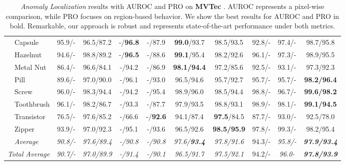\documentclass[10pt,twocolumn,letterpaper]{article}
\begin{document}
\begin{table*}[!ht]
\begin{tabular}{ccccccccccc}
\multicolumn{1}{c|}{} & \multicolumn{1}{l|}{Capsule} & 95.9/- & \multicolumn{1}{c|}{96.5/87.2} & -/\textbf{96.8} & -/87.9 & \textbf{99.0}/93.7 & 98.5/93.5 & 92.8/- & 97.4/- & 98.7/95.8 \\
\multicolumn{1}{c|}{} & \multicolumn{1}{l|}{Hazelnut} & 94.6/- & \multicolumn{1}{c|}{98.8/89.2} & -/\textbf{96.5} & -/88.6 & \textbf{99.1}/95.4 & 98.2/92.6 & 96.1/- & 97.3/- & 98.9/95.5 \\ 
\multicolumn{1}{c|}{} & \multicolumn{1}{l|}{Metal Nut} & 86.4/- & \multicolumn{1}{c|}{96.6/84.1} & -/94.2 & -/86.9 & \textbf{98.1/94.4} & 97.2/85.6 & 92.5/- & 93.1/- & 97.3/92.3 \\ 
\multicolumn{1}{c|}{} & \multicolumn{1}{l|}{Pill} & 89.6/- & \multicolumn{1}{c|}{97.0/90.0} & -/96.1 & -/93.0 & 96.5/94.6 & 95.7/92.7 & 95.7/- & 95.7/- & \textbf{98.2/96.4} \\ 
\multicolumn{1}{c|}{} & \multicolumn{1}{l|}{Screw} & 96.0/- & \multicolumn{1}{c|}{98.3/94.4} & -/94.2 & -/95.4 & 98.9/96.0 & 98.5/94.4 & 98.8/- & 96.7/- & \textbf{99.6/98.2} \\ 
\multicolumn{1}{c|}{} & \multicolumn{1}{l|}{Toothbrush} & 96.1/- & \multicolumn{1}{c|}{98.2/86.7} & -/93.3 & -/87.7 & 97.9/93.5 & 98.8/93.1 & 98.9/- & 98.1/- & \textbf{99.1/94.5} \\ 
\multicolumn{1}{c|}{} & \multicolumn{1}{l|}{Transistor} & 76.5/- & \multicolumn{1}{c|}{97.6/85.2} & -/66.6 & -/\textbf{92.6} & 94.1/87.4 & \textbf{97.5}/84.5 & 87.7/- & 93.0/- & 92.5/78.0 \\ 
\multicolumn{1}{c|}{} & \multicolumn{1}{l|}{Zipper} & 93.9/- & \multicolumn{1}{c|}{97.0/92.3} & -/95.1 & -/93.6 & 96.5/92.6 & \textbf{98.5/95.9} & 97.8/- & 99.3/- & 98.2/95.4 \\ \cline{2-11} 
\multicolumn{1}{c|}{} & \multicolumn{1}{l|}{\textit{Average}} & \textit{90.8/-} & \multicolumn{1}{c|}{\textit{97.6/89.4}} & \textit{-/90.8} & \textit{-/90.8} & \textit{97.6/\textbf{93.4}} & \textit{97.8/91.6} & 94.3/- & \textit{95.8/-} & \textit{\textbf{97.9/93.4}} \\ \hline
\multicolumn{2}{c}{\textit{Total Average}} & \textit{90.7/-} & \textit{97.0/89.9} & \textit{-/91.4} & \textit{-/90.1} & \textit{96.5/91.7} & \textit{97.5/92.1} & 94.2/- & \textit{96.0-} & \textit{\textbf{97.8/93.9}} \\ \hline
\end{tabular}
\caption{\emph{Anomaly Localization} results with AUROC and PRO on \textbf{MVTec} \cite{mvtec}. AUROC represents a pixel-wise comparison, while PRO focuses on region-based behavior. We show the best results for AUROC and PRO in bold. Remarkable, our approach is robust and represents state-of-the-art performance under both metrics.}
\label{tab:al}
\end{table*}
\end{document}
